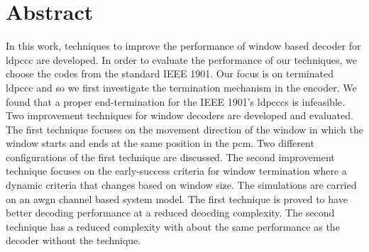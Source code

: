 \chapter*{Abstract}
In this work, techniques to improve the performance of window based decoder for \gls{ldpccc} are developed. In order to evaluate the performance of our techniques, we choose the codes from the standard IEEE 1901. Our focus is on terminated \gls{ldpccc} and so we first investigate the termination mechanism in the encoder. We found that a proper end-termination for the IEEE 1901's \glspl{ldpccc} is infeasible. Two improvement techniques for window decoders are developed and evaluated. The first technique focuses on the movement direction of the window in which the window starts and ends at the same position in the \gls{pcm}. Two different configurations of the first technique are discussed. The second improvement technique focuses on the early-success criteria for window termination where a dynamic criteria that changes based on window size. The simulations are carried on an \gls{awgn} channel based system model. The first technique is proved to have better decoding performance at a reduced deocding complexity. The second technique has a reduced complexity with about the same performance as the decoder without the technique.